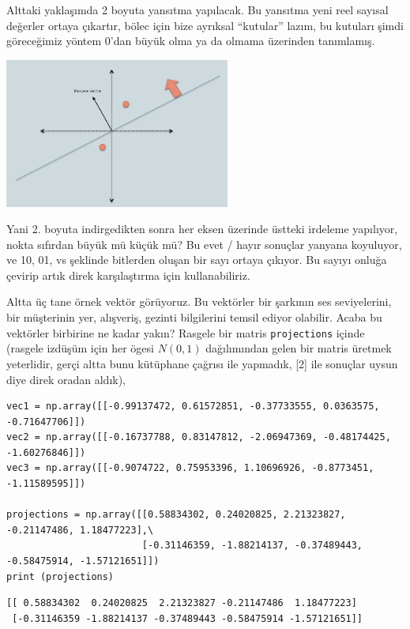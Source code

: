 \documentclass[12pt,fleqn]{article}\usepackage{../../common}
\begin{document}
Alttaki yaklaşımda 2 boyuta yansıtma yapılacak. Bu yansıtma yeni reel sayısal
değerler ortaya çıkartır, bölec için bize ayrıksal ``kutular'' lazım, bu
kutuları şimdi göreceğimiz yöntem 0'dan büyük olma ya da olmama üzerinden
tanımlamış.

\includegraphics[width=20em]{algs_073_hash_02.png}

Yani 2. boyuta indirgedikten sonra her eksen üzerinde üstteki irdeleme
yapılıyor, nokta sıfırdan büyük mü küçük mü? Bu evet / hayır sonuçlar yanyana
koyuluyor, ve 10, 01, vs şeklinde bitlerden oluşan bir sayı ortaya çıkıyor. Bu
sayıyı onluğa çevirip artık direk karşılaştırma için kullanabiliriz.

Altta üç tane örnek vektör görüyoruz. Bu vektörler bir şarkının ses
seviyelerini, bir müşterinin yer, alışveriş, gezinti bilgilerini temsil ediyor
olabilir. Acaba bu vektörler birbirine ne kadar yakın? Rasgele bir matris
\verb!projections! içinde (rasgele izdüşüm için her ögesi $N(0,1)$ dağılımından
gelen bir matris üretmek yeterlidir, gerçi altta bunu kütüphane çağrısı ile
yapmadık, [2] ile sonuçlar uysun diye direk oradan aldık),

\begin{verbatim}
vec1 = np.array([[-0.99137472, 0.61572851, -0.37733555, 0.0363575, -0.71647706]])
vec2 = np.array([[-0.16737788, 0.83147812, -2.06947369, -0.48174425, -1.60276846]])
vec3 = np.array([[-0.9074722, 0.75953396, 1.10696926, -0.8773451, -1.11589595]])

projections = np.array([[0.58834302, 0.24020825, 2.21323827, -0.21147486, 1.18477223],\
                        [-0.31146359, -1.88214137, -0.37489443, -0.58475914, -1.57121651]])
print (projections)
\end{verbatim}

\begin{verbatim}
[[ 0.58834302  0.24020825  2.21323827 -0.21147486  1.18477223]
 [-0.31146359 -1.88214137 -0.37489443 -0.58475914 -1.57121651]]
\end{verbatim}
\end{document}

